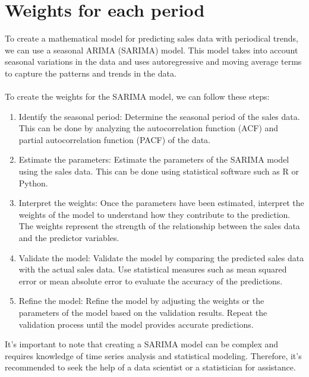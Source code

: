     \section{Weights for each period} \label{sec:weights}
    To create a mathematical model for predicting sales data with periodical trends, we can use a seasonal
    ARIMA (SARIMA) model. This model takes into account seasonal variations in the data and uses autoregressive and
    moving average terms to capture the patterns and trends in the data.\\
    \\
    To create the weights for the SARIMA model, we can follow these steps:
    \begin{enumerate}
        \item Identify the seasonal period: Determine the seasonal period of the sales data. This can be done by
        analyzing the autocorrelation function (ACF) and partial autocorrelation function (PACF) of the data.
        \item Estimate the parameters: Estimate the parameters of the SARIMA model using the sales data.
        This can be done using statistical software such as R or Python.
        \item Interpret the weights: Once the parameters have been estimated, interpret the weights of the model
        to understand how they contribute to the prediction. The weights represent the strength of the relationship
        between the sales data and the predictor variables.
        \item Validate the model: Validate the model by comparing the predicted sales data with the actual sales data.
        Use statistical measures such as mean squared error or mean absolute error to evaluate the
        accuracy of the predictions.
        \item Refine the model: Refine the model by adjusting the weights or the parameters of the model based on
        the validation results. Repeat the validation process until the model provides accurate predictions.
    \end{enumerate}
    It's important to note that creating a SARIMA model can be complex and requires knowledge of time series
    analysis and statistical modeling. Therefore, it's recommended to seek the help of a data scientist
    or a statistician for assistance.
